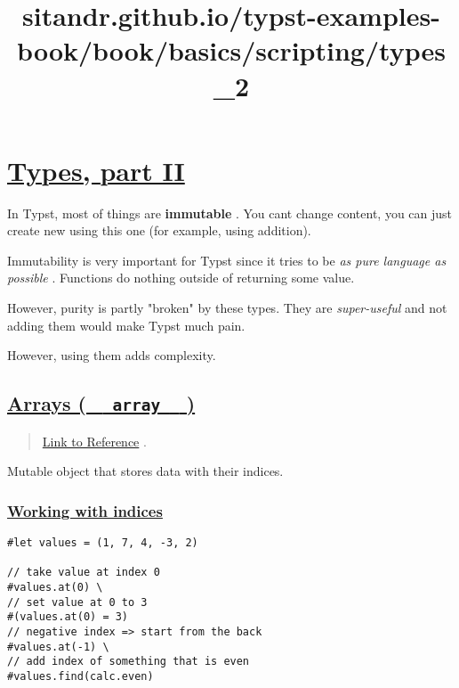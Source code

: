 \title{sitandr.github.io/typst-examples-book/book/basics/scripting/types_2}

\section{\texorpdfstring{\hyperref[types-part-ii]{Types, part
II}}{Types, part II}}\label{types-part-ii}

In Typst, most of things are \textbf{immutable} . You
can\textquotesingle t change content, you can just create new using this
one (for example, using addition).

Immutability is very important for Typst since it tries to be \emph{as
pure language as possible} . Functions do nothing outside of returning
some value.

However, purity is partly "broken" by these types. They are
\emph{super-useful} and not adding them would make Typst much pain.

However, using them adds complexity.

\subsection{\texorpdfstring{\hyperref[arrays-array]{Arrays (
\texttt{\ }{\texttt{\ array\ }}\texttt{\ }
)}}{Arrays (   array   )}}\label{arrays-array}

\begin{quote}
\href{https://typst.app/docs/reference/foundations/array/}{Link to
Reference} .
\end{quote}

Mutable object that stores data with their indices.

\subsubsection{\texorpdfstring{\hyperref[working-with-indices]{Working
with indices}}{Working with indices}}\label{working-with-indices}

\begin{verbatim}
#let values = (1, 7, 4, -3, 2)

// take value at index 0
#values.at(0) \
// set value at 0 to 3
#(values.at(0) = 3)
// negative index => start from the back
#values.at(-1) \
// add index of something that is even
#values.find(calc.even)
\end{verbatim}

\pandocbounded{}


